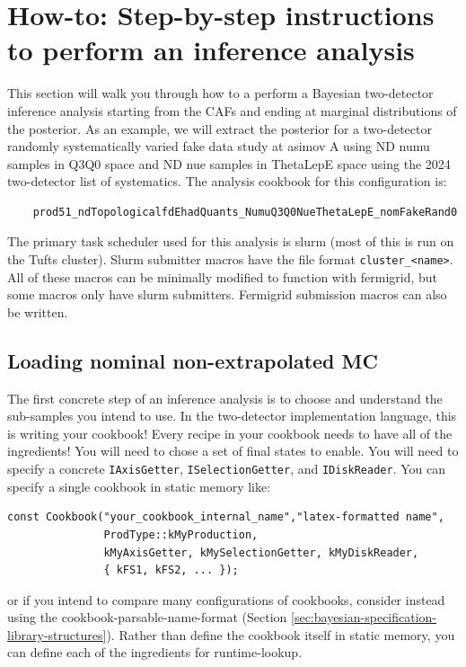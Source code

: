 \documentclass{article}
\begin{document}
\section{How-to: Step-by-step instructions to perform an inference analysis}
\label{sec:how_to}
This section will walk you through how to a perform a Bayesian two-detector inference analysis starting from the CAFs and ending at marginal distributions of the posterior. As an example, we will extract the posterior for a two-detector randomly systematically varied fake data study at asimov A using ND numu samples in Q3Q0 space and ND nue samples in ThetaLepE space using the 2024 two-detector list of systematics. The analysis cookbook for this configuration is:
\begin{verbatim}
    prod51_ndTopologicalfdEhadQuants_NumuQ3Q0NueThetaLepE_nomFakeRand0
\end{verbatim}

The primary task scheduler used for this analysis is slurm (most of this is run on the Tufts cluster). Slurm submitter macros have the file format \texttt{cluster\_<name>}. All of these macros can be minimally modified to function with fermigrid, but some macros only have slurm submitters. Fermigrid submission macros can also be written.

\subsection{Loading nominal non-extrapolated MC}
The first concrete step of an inference analysis is to choose and understand the sub-samples you intend to use. In the two-detector implementation language, this is writing your cookbook! Every recipe in your cookbook needs to have all of the ingredients! You will need to chose a set of final states to enable. You will need to specify a concrete \texttt{IAxisGetter}, \texttt{ISelectionGetter}, and \texttt{IDiskReader}. You can specify a single cookbook in static memory like:
\begin{verbatim}
const Cookbook("your_cookbook_internal_name","latex-formatted name",
               ProdType::kMyProduction,
               kMyAxisGetter, kMySelectionGetter, kMyDiskReader,
               { kFS1, kFS2, ... });
\end{verbatim}
or if you intend to compare many configurations of cookbooks, consider instead using the cookbook-parsable-name-format (Section \ref{sec:bayesian-specification-library-structures}). Rather than define the cookbook itself in static memory, you can define each of the ingredients for runtime-lookup.
\end{document}
